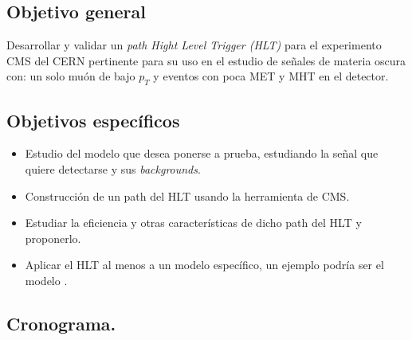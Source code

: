 \subsection{Objetivo general}

Desarrollar y validar un \textit{path Hight Level Trigger (HLT)} para el experimento CMS del CERN pertinente para su uso en el estudio de señales de materia oscura con: un solo muón de bajo $p_T$ y eventos con poca MET y MHT en el detector.

\subsection{Objetivos específicos}

\begin{itemize}
	\item Estudio del modelo que desea ponerse a prueba, estudiando la señal que quiere detectarse y sus \textit{backgrounds}.
	\item Construcción de un path del HLT usando la herramienta de CMS.
	\item Estudiar la eficiencia y otras características de dicho path del HLT y proponerlo.
	\item Aplicar el HLT al menos a un modelo específico, un ejemplo podría ser el modelo \cite{1475-7516-2016-03-048}.
\end{itemize}


\subsection{Cronograma.}

\begin{table}[h]
	\centering
\end{table}
\newpage

